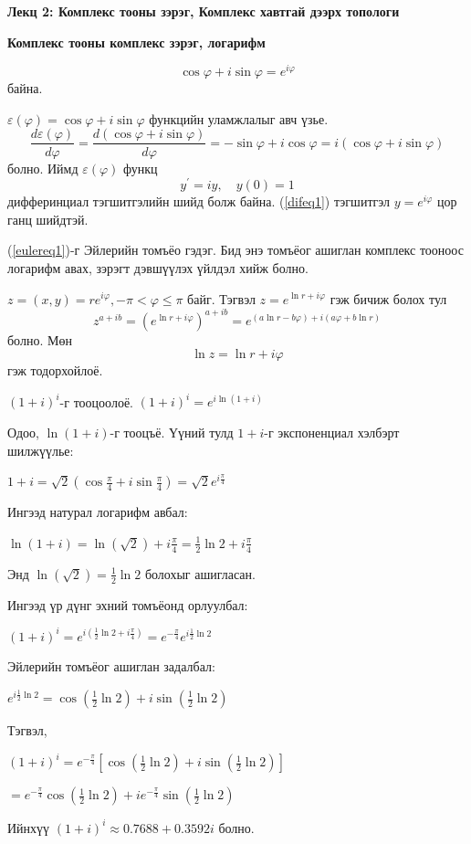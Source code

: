 \begin{center}
    \Large{\textbf{Лекц 2: Комплекс тооны зэрэг, Комплекс хавтгай дээрх топологи}}
\end{center}
\begin{center}
    \textbf{Комплекс тооны комплекс зэрэг, логарифм}
\end{center}
\begin{thm}
\begin{equation}\label{eulereq1}
    \cos\varphi+i\sin\varphi=e^{i\varphi}
\end{equation}
    байна.
\end{thm}
\begin{prf}
   $ \varepsilon(\varphi)=\cos\varphi+i\sin\varphi$ функцийн уламжлалыг авч үзье. 
   $$\dfrac{d \varepsilon(\varphi)}{d\varphi}=\dfrac{d (\cos\varphi+i\sin\varphi)}{d\varphi}=-\sin\varphi+i\cos\varphi=i(\cos\varphi+i\sin\varphi)$$ болно. Иймд $\varepsilon(\varphi)$ функц 
   \begin{equation}\label{difeq1}
      y^{\prime}=iy, \quad y(0)=1    
   \end{equation}
  дифферинциал тэгшитгэлийн шийд болж байна. (\ref{difeq1}) тэгшитгэл $y=e^{i\varphi}$ цор ганц шийдтэй.
\end{prf}
(\ref{eulereq1})-г Эйлерийн томъёо гэдэг. Бид энэ томъёог ашиглан комплекс тооноос логарифм авах, зэрэгт дэвшүүлэх үйлдэл хийж болно.

$z=(x,y)=re^{i\varphi} , -\pi<\varphi\leq \pi$ байг.  Тэгвэл $z=e^{\ln r+i\varphi}$ гэж бичиж болох тул $$z^{a+ib}=(e^{\ln r+i\varphi})^{a+ib}=e^{(a\ln r-b\varphi)+i(a\varphi+b\ln r)}$$
 болно. Мөн $$\ln z=\ln r+i\varphi$$ гэж тодорхойлоё.
 \begin{exm}
     $(1+i)^{i}$-г тооцоолоё. 
$(1+i)^{i} = e^{i \ln(1+i)}$

Одоо, $\ln(1+i)$-г тооцъё. Үүний тулд $1+i$-г экспоненциал хэлбэрт шилжүүлье:

$1+i = \sqrt{2} (\cos \frac{\pi}{4} + i \sin \frac{\pi}{4}) = \sqrt{2} e^{i \frac{\pi}{4}}$

Ингээд натурал логарифм авбал:

$\ln(1+i) = \ln(\sqrt{2}) + i \frac{\pi}{4} = \frac{1}{2} \ln 2 + i \frac{\pi}{4}$

Энд $\ln(\sqrt{2}) = \frac{1}{2} \ln 2$ болохыг ашигласан.

Ингээд үр дүнг эхний томъёонд орлуулбал:

$(1+i)^{i} = e^{i (\frac{1}{2} \ln 2 + i \frac{\pi}{4})} = e^{-\frac{\pi}{4}} e^{i \frac{1}{2} \ln 2}$

Эйлерийн томъёог ашиглан задалбал:

$e^{i \frac{1}{2} \ln 2} = \cos (\frac{1}{2} \ln 2) + i \sin (\frac{1}{2} \ln 2)$

Тэгвэл,

$(1+i)^{i} = e^{-\frac{\pi}{4}} [\cos (\frac{1}{2} \ln 2) + i \sin (\frac{1}{2} \ln 2)]$

$= e^{-\frac{\pi}{4}} \cos (\frac{1}{2} \ln 2) + i e^{-\frac{\pi}{4}} \sin (\frac{1}{2} \ln 2)$

Ийнхүү $(1+i)^{i} \approx 0.7688 + 0.3592i$ болно.
 \end{exm}
